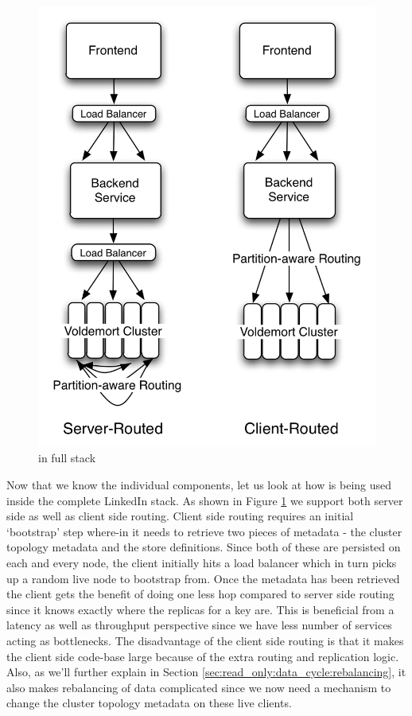 \documentclass[10pt,twocolumn,preprint,nonatbib,numbers]{sigplanconf}
\begin{document}
\begin{figure}
  \centering
    \includegraphics[scale=0.60]{images/fullstack.png}
  \caption{\projectname{} in full stack}
  \label{fullstack}
\end{figure}


\noindent 
Now that we know the individual components, let us look at how \projectname{} is being used inside the complete LinkedIn stack. As shown in Figure \ref{fullstack} we support both server side as well as client side routing. Client side routing requires an initial `bootstrap' step where-in it needs to retrieve two pieces of metadata - the cluster topology metadata and the store definitions. Since both of these are persisted on each and every \projectname{} node, the client initially hits a load balancer which in turn picks up a random live node to bootstrap from. Once the metadata has been retrieved the client gets the benefit of doing one less hop compared to server side routing since it knows exactly where the replicas for a key are. This is beneficial from a latency as well as throughput perspective since we have less number of services acting as bottlenecks. The disadvantage of the client side routing is that it makes the client side code-base large because of the extra routing and replication logic. Also, as we'll further explain in Section \ref{sec:read_only:data_cycle:rebalancing}, it also makes rebalancing of data complicated since we now need a mechanism to change the cluster topology metadata on these live clients. 
\end{document}
